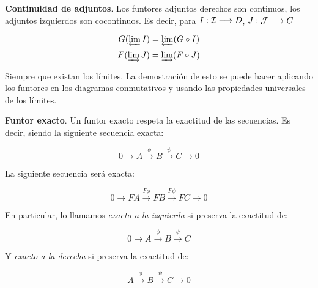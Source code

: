 \documentclass[11pt]{article}
\begin{document}
\begin{itemize}
\begin{theorem}
\textbf{Continuidad de adjuntos}. Los funtores adjuntos derechos son continuos, los adjuntos
izquierdos son cocontinuos. Es decir, para $I : {\cal I}\longrightarrow D$, $J : {\cal J}\longrightarrow C$

\[G(\varprojlim I) = \varprojlim (G \circ I)\]
\[F(\varinjlim J) = \varinjlim (F \circ J)\]
\end{theorem}

Siempre que existan los límites. La demostración de esto se puede hacer aplicando los
funtores en los diagramas conmutativos y usando las propiedades universales de los límites.

\begin{definition}
\textbf{Funtor exacto}. Un funtor exacto respeta la exactitud de las secuencias. Es decir,
siendo la siguiente secuencia exacta:

\[ 0 \longrightarrow A \overset{\phi}\longrightarrow B \overset{\psi}\longrightarrow C \longrightarrow 0\]

La siguiente secuencia será exacta:

\[ 0 \longrightarrow FA \overset{F\phi}\longrightarrow FB \overset{F\psi}\longrightarrow FC \longrightarrow 0\]
\end{definition}

En particular, lo llamamos \emph{exacto a la izquierda} si preserva la exactitud de:

\[ 0 \longrightarrow A \overset{\phi}\longrightarrow B \overset{\psi}\longrightarrow C\]

Y \emph{exacto a la derecha} si preserva la exactitud de:

\[ A \overset{\phi}\longrightarrow B \overset{\psi}\longrightarrow C \longrightarrow 0\]
\end{itemize}
\end{document}
